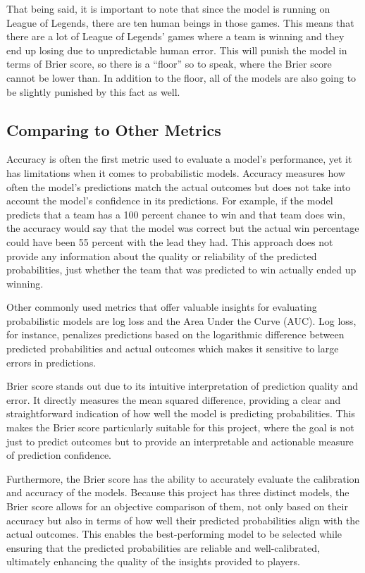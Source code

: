 \documentclass[10pt,twocolumn]{article}
\begin{document}
That being said, it is important to note that since the model is running on League of Legends, there are ten human beings in those games. This means that there are a lot of League of Legends’ games where a team is winning and they end up losing due to unpredictable human error. This will punish the model in terms of Brier score, so there is a “floor” so to speak, where the Brier score cannot be lower than. In addition to the floor, all of the models are also going to be slightly punished by this fact as well.


\subsection{Comparing to Other Metrics}

Accuracy is often the first metric used to evaluate a model's performance, yet it has limitations when it comes to probabilistic models. Accuracy measures how often the model’s predictions match the actual outcomes but does not take into account the model’s confidence in its predictions. For example, if the model predicts that a team has a 100 percent chance to win and that team does win, the accuracy would say that the model was correct but the actual win percentage could have been 55 percent with the lead they had. This approach does not provide any information about the quality or reliability of the predicted probabilities, just whether the team that was predicted to win actually ended up winning.

Other commonly used metrics that offer valuable insights for evaluating probabilistic models are log loss and the Area Under the Curve (AUC). Log loss, for instance, penalizes predictions based on the logarithmic difference between predicted probabilities and actual outcomes which makes it sensitive to large errors in predictions. 

Brier score stands out due to its intuitive interpretation of prediction quality and error. It directly measures the mean squared difference, providing a clear and straightforward indication of how well the model is predicting probabilities. This makes the Brier score particularly suitable for this project, where the goal is not just to predict outcomes but to provide an interpretable and actionable measure of prediction confidence.

Furthermore, the Brier score has the ability to accurately evaluate the calibration and accuracy of the models. Because this project has three distinct models, the Brier score allows for an objective comparison of them, not only based on their accuracy but also in terms of how well their predicted probabilities align with the actual outcomes. This enables the best-performing model to be selected while ensuring that the predicted probabilities are reliable and well-calibrated, ultimately enhancing the quality of the insights provided to players.
\end{document}
